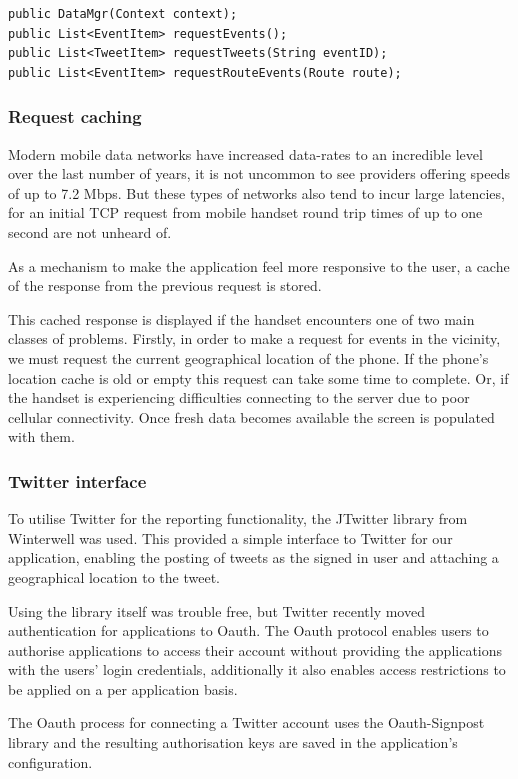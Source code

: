 \begin{lstlisting}
public DataMgr(Context context);
public List<EventItem> requestEvents();
public List<TweetItem> requestTweets(String eventID);
public List<EventItem> requestRouteEvents(Route route);
\end{lstlisting}

\subsubsection{Request caching}
Modern mobile data networks have increased data-rates to an incredible level
over the last number of years, it is not uncommon to see providers offering
speeds of up to 7.2 Mbps. But these types of networks also tend to incur large
latencies, for an initial TCP request from mobile handset round trip times of
up to one second are not unheard of.

As a mechanism to make the application feel more responsive to the user, a
cache of the response from the previous request is stored.

This cached response is displayed if the handset encounters one of two main
classes of problems. Firstly, in order to make a request for events in the
vicinity, we must request the current geographical location of the phone. If
the phone's location cache is old or empty this request can take some time to
complete. Or, if the handset is experiencing difficulties connecting to
the server due to poor cellular connectivity. Once fresh data becomes available
the screen is populated with them. 

\subsubsection{Twitter interface}
To utilise Twitter for the reporting functionality, the JTwitter library from
Winterwell was used. This provided a simple interface to Twitter for our
application, enabling the posting of tweets as the signed in user and attaching
a geographical location to the tweet.

Using the library itself was trouble free, but Twitter recently moved
authentication for applications to Oauth. The Oauth protocol enables users to
authorise applications to access their account without providing the
applications with the users' login credentials, additionally it also enables
access restrictions to be applied on a per application basis.

The Oauth process for connecting a Twitter account uses the Oauth-Signpost
library and the resulting authorisation keys are saved in the application's
configuration. 

